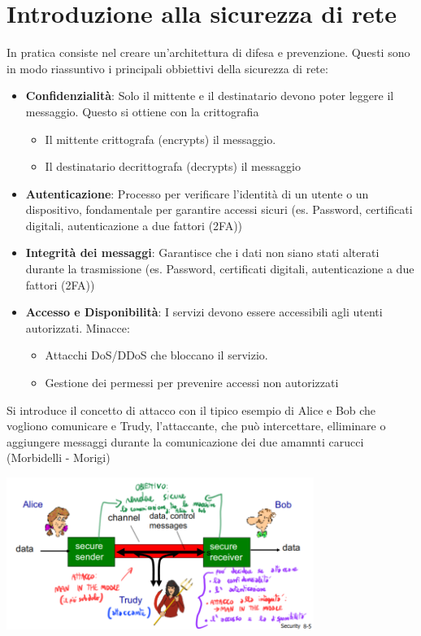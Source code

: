 \chapter{Introduzione alla sicurezza di rete}


In pratica consiste nel creare un'architettura di difesa e prevenzione. Questi sono in modo riassuntivo i principali obbiettivi della sicurezza di rete:
\begin{itemize}
    \item \textbf{Confidenzialità}: Solo il mittente e il destinatario devono poter leggere il messaggio. Questo si ottiene con la crittografia
    \begin{itemize}
        \item Il mittente crittografa (encrypts) il messaggio.
        \item Il destinatario decrittografa (decrypts) il messaggio
    \end{itemize}
    \item \textbf{Autenticazione}: Processo per verificare l’identità di un utente o un dispositivo, fondamentale per garantire accessi sicuri (es. Password, certificati digitali, autenticazione a due fattori (2FA))
    \item \textbf{Integrità dei messaggi}: Garantisce che i dati non siano stati alterati durante la trasmissione (es. Password, certificati digitali, autenticazione a due fattori (2FA))
    \item \textbf{Accesso e Disponibilità}: I servizi devono essere accessibili agli utenti autorizzati. Minacce:
    \begin{itemize}
        \item Attacchi DoS/DDoS che bloccano il servizio.
        \item Gestione dei permessi per prevenire accessi non autorizzati
    \end{itemize}
\end{itemize}

Si introduce il concetto di attacco con il tipico esempio di Alice e Bob che vogliono comunicare e Trudy, l'attaccante, che può intercettare, elliminare o aggiungere messaggi durante la comunicazione dei due amamnti carucci (Morbidelli - Morigi)
\begin{center}
    \includegraphics[width=10cm]{img/trudy_bob_alice.png}
\end{center}

